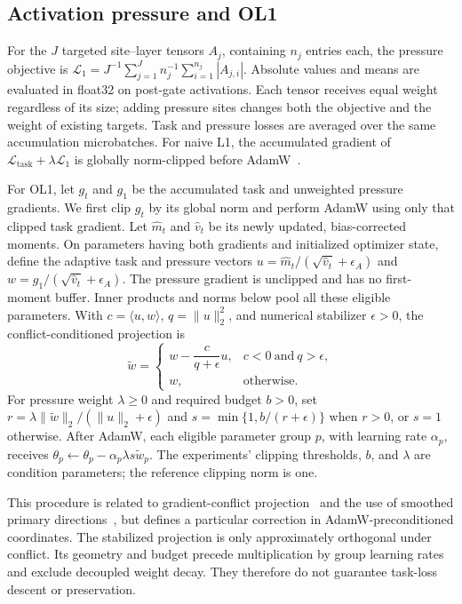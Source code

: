 \subsection{Activation pressure and OL1}
\label{app:pressure}

For the $J$ targeted site--layer tensors $A_j$, containing $n_j$ entries each,
the pressure objective is
$\mathcal{L}_1=J^{-1}\sum_{j=1}^{J}n_j^{-1}\sum_{i=1}^{n_j}|A_{j,i}|$.
Absolute values and means are evaluated in float32 on post-gate activations.
Each tensor receives equal weight regardless of its size; adding pressure
sites changes both the objective and the weight of existing targets.
Task and pressure losses are averaged over the same accumulation microbatches.
For naive L1, the accumulated gradient of
$\mathcal{L}_{\mathrm{task}}+\lambda\mathcal{L}_1$ is globally norm-clipped
before AdamW~\citep{loshchilov2019adamw}.

For OL1, let $g_t$ and $g_1$ be the accumulated task and unweighted pressure
gradients. We first clip $g_t$ by its global norm and perform AdamW using only
that clipped task gradient. Let $\widehat m_t$ and $\widehat v_t$ be its newly
updated, bias-corrected moments. On parameters having both gradients and
initialized optimizer state, define the adaptive task and pressure vectors
$u=\widehat m_t/(\sqrt{\widehat v_t}+\epsilon_A)$ and
$w=g_1/(\sqrt{\widehat v_t}+\epsilon_A)$. The pressure gradient is unclipped
and has no first-moment buffer. Inner products and norms below pool all these
eligible parameters. With $c=\langle u,w\rangle$, $q=\|u\|_2^2$, and numerical
stabilizer $\epsilon>0$, the conflict-conditioned projection is
\begin{equation}
\widetilde w=
\begin{cases}
w-\dfrac{c}{q+\epsilon}u, & c<0\ \text{and}\ q>\epsilon,\\[3pt]
w, & \text{otherwise}.
\end{cases}
\label{eq:ol1-projection}
\end{equation}
For pressure weight $\lambda\geq0$ and required budget $b>0$, set
$r=\lambda\|\widetilde w\|_2/(\|u\|_2+\epsilon)$ and
$s=\min\{1,b/(r+\epsilon)\}$ when $r>0$, or $s=1$ otherwise. After AdamW,
each eligible parameter group $p$, with learning rate $\alpha_p$, receives
$\theta_p\leftarrow\theta_p-\alpha_p\lambda s\widetilde w_p$.
The experiments' clipping thresholds, $b$, and $\lambda$ are condition
parameters; the reference clipping norm is one.

This procedure is related to gradient-conflict projection~\citep{yu2020pcgrad}
and the use of smoothed primary directions~\citep{hsieh2024bloop}, but defines
a particular correction in AdamW-preconditioned coordinates. The stabilized
projection is only approximately orthogonal under conflict. Its geometry and
budget precede multiplication by group learning rates and exclude decoupled
weight decay. They therefore do not guarantee task-loss descent or preservation.

